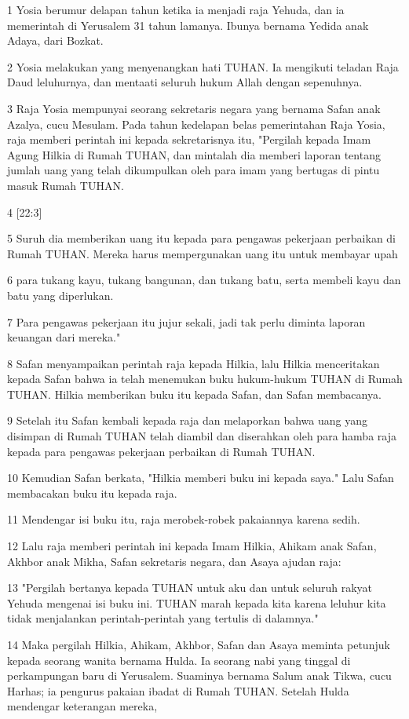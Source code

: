 \par 1 Yosia berumur delapan tahun ketika ia menjadi raja Yehuda, dan ia memerintah di Yerusalem 31 tahun lamanya. Ibunya bernama Yedida anak Adaya, dari Bozkat.
\par 2 Yosia melakukan yang menyenangkan hati TUHAN. Ia mengikuti teladan Raja Daud leluhurnya, dan mentaati seluruh hukum Allah dengan sepenuhnya.
\par 3 Raja Yosia mempunyai seorang sekretaris negara yang bernama Safan anak Azalya, cucu Mesulam. Pada tahun kedelapan belas pemerintahan Raja Yosia, raja memberi perintah ini kepada sekretarisnya itu, "Pergilah kepada Imam Agung Hilkia di Rumah TUHAN, dan mintalah dia memberi laporan tentang jumlah uang yang telah dikumpulkan oleh para imam yang bertugas di pintu masuk Rumah TUHAN.
\par 4 [22:3]
\par 5 Suruh dia memberikan uang itu kepada para pengawas pekerjaan perbaikan di Rumah TUHAN. Mereka harus mempergunakan uang itu untuk membayar upah
\par 6 para tukang kayu, tukang bangunan, dan tukang batu, serta membeli kayu dan batu yang diperlukan.
\par 7 Para pengawas pekerjaan itu jujur sekali, jadi tak perlu diminta laporan keuangan dari mereka."
\par 8 Safan menyampaikan perintah raja kepada Hilkia, lalu Hilkia menceritakan kepada Safan bahwa ia telah menemukan buku hukum-hukum TUHAN di Rumah TUHAN. Hilkia memberikan buku itu kepada Safan, dan Safan membacanya.
\par 9 Setelah itu Safan kembali kepada raja dan melaporkan bahwa uang yang disimpan di Rumah TUHAN telah diambil dan diserahkan oleh para hamba raja kepada para pengawas pekerjaan perbaikan di Rumah TUHAN.
\par 10 Kemudian Safan berkata, "Hilkia memberi buku ini kepada saya." Lalu Safan membacakan buku itu kepada raja.
\par 11 Mendengar isi buku itu, raja merobek-robek pakaiannya karena sedih.
\par 12 Lalu raja memberi perintah ini kepada Imam Hilkia, Ahikam anak Safan, Akhbor anak Mikha, Safan sekretaris negara, dan Asaya ajudan raja:
\par 13 "Pergilah bertanya kepada TUHAN untuk aku dan untuk seluruh rakyat Yehuda mengenai isi buku ini. TUHAN marah kepada kita karena leluhur kita tidak menjalankan perintah-perintah yang tertulis di dalamnya."
\par 14 Maka pergilah Hilkia, Ahikam, Akhbor, Safan dan Asaya meminta petunjuk kepada seorang wanita bernama Hulda. Ia seorang nabi yang tinggal di perkampungan baru di Yerusalem. Suaminya bernama Salum anak Tikwa, cucu Harhas; ia pengurus pakaian ibadat di Rumah TUHAN. Setelah Hulda mendengar keterangan mereka,
